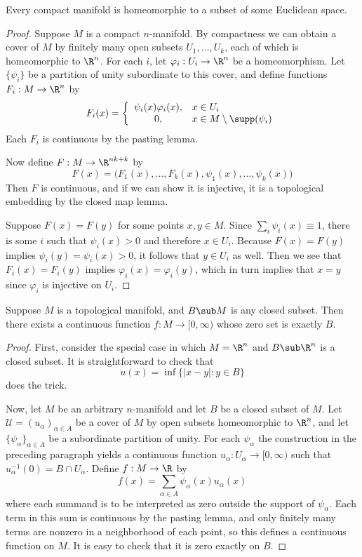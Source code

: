 \begin{theorem}
Every compact manifold is homeomorphic to a subset of some Euclidean space.
\end{theorem}
\begin{proof}
Suppose $M$ is a compact $n$-manifold. By compactness we can obtain a cover of $M$ by finitely many open subsets $U_1,\dots,U_k$, each of which is homeomorphic to $\R^n$. For each $i$, let $\varphi_i:U_i\to\R^n$ be a homeomorphism. Let $\{\psi_i\}$ be a partition of unity subordinate to this cover, and define functions $F_i:M\to \R^n$ by
\[F_i(x)=\left\{\begin{array}{cl}
\psi_i(x)\varphi_i(x), &x\in U_i\\
0, &x\in M\setminus \supp(\psi_i)
\end{array}\right. \]
Each $F_i$ is continuous by the pasting lemma.\par
Now define $F:M\to \R^{nk+k}$ by
\[F(x)=\big(F_1(x),\dots,F_k(x),\psi_1(x),\dots,\psi_k(x)\big)\] 
Then $F$ is continuous, and if we can show it is injective, it is a topological embedding
by the closed map lemma.\par
Suppose $F(x)=F(y)$ for some points $x,y\in M$. Since $\sum_i\psi_i(x)\equiv1$, there is some $i$ such that $\psi_i(x)>0$ and therefore $x\in U_i$. Because $F(x)=F(y)$ implies $\psi_i(y)=\psi_i(x)>0$, it follows that $y\in U_i$ as well. Then we see that $F_i(x)=F_i(y)$ implies $\varphi_i(x)=\varphi_i(y)$, which in turn implies that $x=y$ since $\varphi_i$ is injective on $U_i$.
\end{proof}
\begin{theorem}
Suppose $M$ is a topological manifold, and $B\sub M$ is any closed subset. Then there exists a continuous function $f:M\to[0,\infty)$ whose zero set is exactly $B$.
\end{theorem}
\begin{proof}
First, consider the special case in which $M=\R^n$ and $B\sub\R^n$ is a closed subset. It is straightforward to check that
\[u(x)=\inf\{|x-y|:y\in B\}\]
does the trick.\par
Now, let $M$ be an arbitrary $n$-manifold and let $B$ be a closed subset of $M$. Let $\mathcal{U}=(u_\alpha)_{\alpha\in A}$ be a cover of $M$ by open subsets homeomorphic to $\R^n$, and
let $\{\psi_\alpha\}_{\alpha\in A}$ be a subordinate partition of unity. For each $\psi_\alpha$ the construction in the preceding paragraph yields a continuous function $u_\alpha:U_\alpha\to [0,\infty)$ such that $u_\alpha^{-1}(0)=B\cap U_\alpha$. Define $f:M\to \R$ by
\[f(x)=\sum_{\alpha\in A}\psi_\alpha(x)u_\alpha(x)\]
where each summand is to be interpreted as zero outside the support of $\psi_\alpha$. Each term in this sum is continuous by the pasting lemma, and only finitely many terms are nonzero in a neighborhood of each point, so this defines a continuous function on $M$. It is easy to check that it is zero exactly on $B$.
\end{proof}
